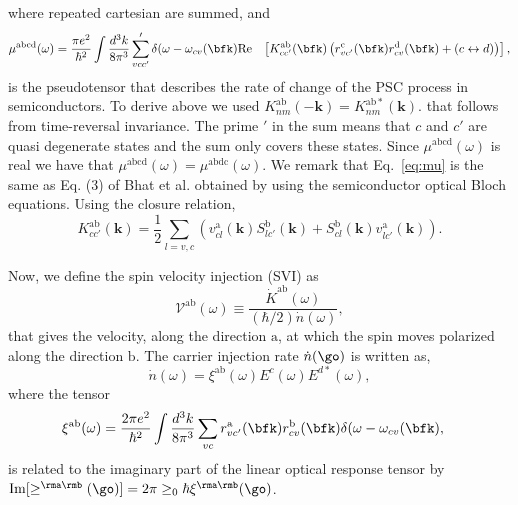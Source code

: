 \documentclass[floatfix,prb,aps,superscriptaddress,showpacs,11pt,preprint,letterpaper]{revtex4}
\begin{document}
where repeated cartesian are summed, and 
\begin{equation}\label{eq:mu}
\begin{aligned}
\mu^{\mathrm{abcd}}  (\omega) &
=
\frac{\pi e^{2}}{\hbar^{2}} \int 
\frac{d^{3}k}{8 \pi^{3}} \sum'_{vcc'}
  \delta(\omega-\omega_{cv}(\bfk) 
\mathrm{Re} & \left[ K^{\mathrm{ab}}_{cc'}(\bfk) 
\left(  
r^{\mathrm{c}}_{vc'}(\bfk)   
r^{\mathrm{d}}_{cv }(\bfk)  +
(c \leftrightarrow d)  
\right) 
\right]
,  
\end{aligned}
\end{equation} 
is the pseudotensor that describes the rate of change of the  PSC process in
semiconductors. To derive above we used
$
K^{\mathrm{ab}}_{nm}(\mathbf{-k}) = K^{\mathrm{ab*}}_{nm}(\mathbf{k}). 
$
that follows from time-reversal invariance. The prime $'$ in the sum means that
$c$ and $c'$ are quasi degenerate states and the sum only covers these states.
Since $\mu^{\mathrm{abcd}}(\omega)$ is real we have that
$\mu^{\mathrm{abcd}}(\omega) =
\mu^{\mathrm{abdc}}(\omega)$. 
We remark that Eq.~\eqref{eq:mu} 
 is the same as Eq. (3) of Bhat et al.\cite{bhatPRL05}
obtained by using the semiconductor optical Bloch equations.
Using the closure relation,
\begin{equation}
K^{\mathrm{ab}}_{cc'}(\mathbf{k}) = \frac{1}{2}
\sum_{l=v,c}
\left(v^{\mathrm{a}}_{cl}(\mathbf{k})S^{\mathrm{b}}_{lc'}(\mathbf{k})
+S^{\mathrm{b}}_{cl}(\mathbf{k}) v^{\mathrm{a}}_{lc'}(\mathbf{k})
\right)
.
\label{eq:velspimatelem}
\end{equation}


Now, we define the spin velocity injection (SVI) as
\begin{equation}\label{eq:vab-w}
\mathcal{V}^{\mathrm{ab}}(\omega) \equiv
\frac{\dot{K}^{\mathrm{ab}}(\omega)}{(\hbar/2) \dot{n}(\omega)},
\end{equation}  
that gives the velocity, along the direction $\mathrm{a}$, at which the spin
moves polarized along the direction $\mathrm{b}$. The carrier injection rate
$\dot n(\go)$ is written as,\cite{nastosPRB05}
\begin{equation}
\dot{n}(\omega) =
\xi^{\mathrm{ab}}(\omega) E^{c }(\omega) E^{d*}(\omega),
\label{eq:dotn}
\end{equation}
where the tensor 
\begin{equation}\label{eq:xi}
\begin{aligned}
\xi^{\mathrm{ab}}(\omega)
&
=
\frac{2\pi e^{2}}{\hbar^{2}} \int 
\frac{d^{3}k}{8 \pi^{3}}
 \sum_{vc}
r^{\mathrm{a}}_{vc'}(\bfk)  
r^{\mathrm{b}}_{cv }(\bfk)  
\delta(\omega-\omega_{cv}(\bfk) 
, 
\end{aligned}
\end{equation}
is related to the imaginary part of the linear optical 
response tensor by
$\mathrm{Im}[\ge^{\rma\rmb}(\go)]=2\pi\ge_0\hbar\xi^{\rma\rmb}(\go)$.
\end{document}
